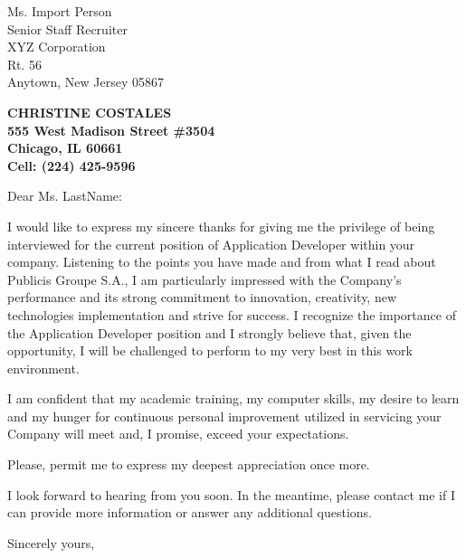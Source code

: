 \documentclass[11pt]{letter} %
\begin{document}
\signature{Christine Costales}                     %
\longindentation=0pt                       %
\let\raggedleft\raggedright                %
 
\begin{letter}{Ms. Import Person \\
Senior Staff Recruiter \\
XYZ Corporation \\
Rt. 56 \\
Anytown, New Jersey 05867} 

\begin{center}
\large\bf CHRISTINE COSTALES  \\
555 West Madison Street \#3504 \\ Chicago, IL 60661 \\ Cell: (224) 425-9596
\end{center} 
\vfill %


 
\opening{Dear Ms. LastName:} 


	
I would like to express my sincere thanks for giving me the privilege of being interviewed 
for the current position of Application Developer within your company.  Listening to the 
points you have made and from what I read about Publicis Groupe S.A., I am particularly 
impressed with the Company’s performance and its strong commitment to innovation, creativity, 
new technologies implementation and strive for success. I recognize the importance of the 
Application Developer position and I strongly believe that, given the opportunity, I will be 
challenged to perform to my very best in this work environment.

I am confident that my academic training, my computer skills, my desire to learn and my hunger 
for continuous personal improvement utilized in servicing your Company will meet and, I promise, 
exceed your expectations.   

Please, permit me to express my deepest appreciation once more.

I look forward to hearing from you soon.  In the meantime, please contact me if I can provide more information or answer any additional questions.

\closing{Sincerely yours,}
 
 

\end{letter}
 
\end{document}
